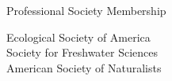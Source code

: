 \documentclass{resume} %
\begin{document}
\bigskip

\begin{rSection}{Professional Society Membership}

Ecological Society of America\\
Society for Freshwater Sciences\\
American Society of Naturalists\\ 

\end{rSection}

%
%
%
%
\end{document}
